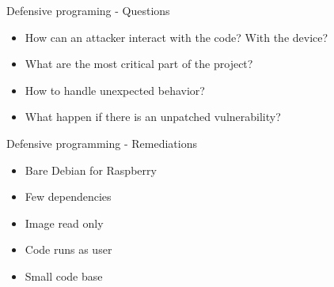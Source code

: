 \begin{frame}[fragile]{Defensive programing - Questions}
    \begin{itemize}
        \item How can an attacker interact with the code? With the device?
        \item What are the most critical part of the project?
        \item How to handle unexpected behavior?
        \item What happen if there is an unpatched vulnerability?
   \end{itemize}
\end{frame}

\begin{frame}[fragile]{Defensive programming - Remediations}
    \begin{itemize}
        \item Bare Debian for Raspberry
        \item Few dependencies
        \item Image read only
        \item Code runs as user
        \item Small code base
   \end{itemize}
\end{frame}


